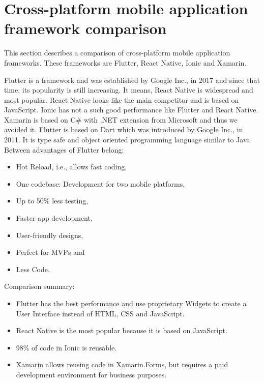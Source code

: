 \section{Cross-platform mobile application framework comparison}\label{sec:cross-platform-mobile-application-framework-comparison}
This section describes a comparison of cross-platform mobile application frameworks.
These frameworks are Flutter, React Native, Ionic and Xamarin.

Flutter is a framework and was established by Google Inc., in 2017 and since that time, its popularity is still increasing.
It means, React Native is widespread and most popular.
React Native looks like the main competitor and is based on JavaScript.\cite{flutterVsReactNativeNevercodeIo}
Ionic has not a such good performance like Flutter and React Native.\cite{crossPlatformFrameworokComparation}
Xamarin is based on C\# with .NET extension from Microsoft and thus we avoided it.
Flutter is based on Dart which was introduced by Google Inc., in 2011.
It is type safe and object oriented programming language similar to Java.\cite{dartTypeSystem}
Between advantages of Flutter belong:
\begin{itemize}
    \item Hot Reload, i.e., allows fast coding,
    \item One codebase: Development for two mobile platforms,
    \item Up to 50\% less testing,
    \item Faster app development,
    \item User-friendly designs,
    \item Perfect for MVPs and
    \item Less Code.\cite{flutterVsReactNativeHackrIo}
\end{itemize}
Comparison summary:
\begin{itemize}
    \item Flutter has the best performance and use proprietary Widgets to create a User Interface instead of HTML, CSS and JavaScript.
    \item React Native is the most popular because it is based on JavaScript.
    \item 98\% of code in Ionic is reusable.
    \item Xamarin allows reusing code in Xamarin.Forms, but requires a paid development environment for business purposes.
\end{itemize}